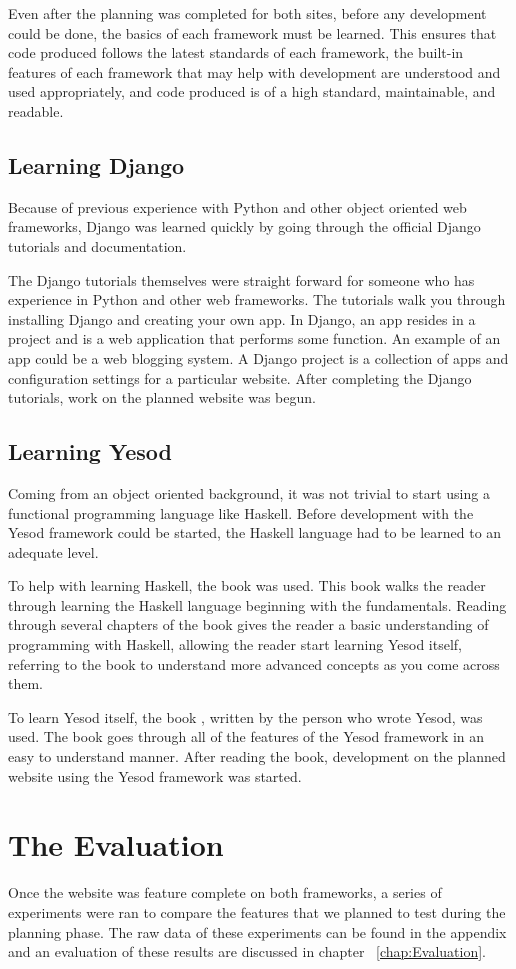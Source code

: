 Even after the planning was completed for both sites, before any development could
be done, the basics of each framework must be learned. This ensures that code
produced follows the latest standards of each framework, the built-in features
of each framework that may help with development are understood and used appropriately,
and code produced is of a high standard, maintainable, and readable.

\subsection{Learning Django}

Because of previous experience with Python and other object oriented web frameworks, 
Django was learned quickly by going through the official Django tutorials and 
documentation.

The Django tutorials themselves were straight forward for someone who has 
experience in Python and other web frameworks. The tutorials walk you through
installing Django and creating your own app. In Django, an app resides in a project
and is a web application that performs some function. An example of an app could be
a web blogging system. A Django project is a collection of apps and configuration
settings for a particular website. After completing the Django tutorials, work
on the planned website was begun. \parencite{djangoIntroDocs}

\subsection{Learning Yesod}

Coming from an object oriented background, it was not trivial to start using
a functional programming language like Haskell. Before development with the
Yesod framework could be started, the Haskell language had to be learned to
an adequate level.

To help with learning Haskell, the book  \parencite{haskellBook}
was used. This book walks the reader through learning the Haskell language beginning
with the fundamentals. Reading through several chapters of the book gives
the reader a basic understanding of programming with Haskell, allowing the reader
start learning Yesod itself, referring to the book to understand more
advanced concepts as you come across them.

To learn Yesod itself, the book  \parencite{yesodBook}, 
written by the person who wrote Yesod, was used. The book goes through all of the
features of the Yesod framework in an easy to understand manner. After
reading the book, development on the planned website using the Yesod
framework was started.

\section{The Evaluation}

Once the website was feature complete on both frameworks, a series of experiments
were ran to compare the features that we planned to test during the planning phase.
The raw data of these experiments can be found in the appendix and an evaluation
of these results are discussed in chapter ~\ref{chap:Evaluation}.